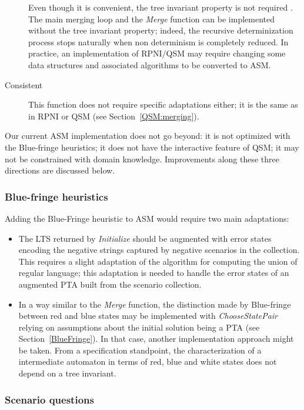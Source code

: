 \begin{description}
Even though it is convenient, the tree invariant property is not required \cite{Lambeau:2008}. The main merging loop and the \emph{Merge} function can be implemented without the tree invariant property; indeed, the recursive determinization process stops naturally when non determinism is completely reduced. In practice, an implementation of RPNI/QSM may require changing some data structures and associated algorithms to be converted to ASM.

\item[Consistent] This function does not require specific adaptations either; it is the same as in RPNI or QSM (see Section~\ref{QSM:merging}).

\end{description}

Our current ASM implementation does not go beyond: it is not optimized with the Blue-fringe heuristics; it does not have the interactive feature of QSM; it may not be constrained with domain knowledge. Improvements along these three directions are discussed below.

\subsubsection*{Blue-fringe heuristics}

Adding the Blue-Fringe heuristic to ASM would require two main adaptations: 
\begin{itemize}
\item The LTS returned by \emph{Initialize} should be augmented with error states encoding the negative strings captured by negative scenarios in the collection. This requires a slight adaptation of the algorithm for computing the union of regular language; this adaptation is needed to handle the error states of an augmented PTA built from the scenario collection.
\item In a way similar to the \emph{Merge} function, the distinction made by Blue-fringe between red and blue states may be implemented with \emph{ChooseStatePair} relying on assumptions about the initial solution being a PTA (see Section~\ref{BlueFringe}). In that case, another implementation approach might be taken. From a specification standpoint, the characterization of a intermediate automaton in terms of red, blue and white states does not depend on a tree invariant.
\end{itemize}

\subsubsection*{Scenario questions}

